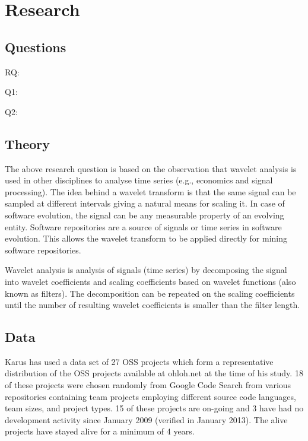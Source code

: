 \section{Research}

\subsection{Questions}

\begin{description}
	\item[RQ:] \emph{\researchQuestion}
	\item[Q1:] \emph{\subQuestionOne}
	\item[Q2:] \emph{\subQuestionTwo}
\end{description}

\subsection{Theory}
The above research question is based on the observation that wavelet analysis is
used in other disciplines to analyse time series (e.g., economics and signal
processing). The idea behind a wavelet transform is that the same signal can
be sampled at different intervals giving a natural means for scaling it. In
case of software evolution, the signal can be any measurable property of an
evolving entity. Software repositories are a source of signals or time series
in software evolution. This allows the wavelet transform to be applied directly
for mining software repositories.

Wavelet analysis is analysis of signals (time series) by decomposing the signal
into wavelet coefficients and scaling coefficients based on wavelet functions
(also known as filters). The decomposition can be repeated on the scaling
coefficients until the number of resulting wavelet coefficients is smaller than
the filter length.

\subsection{Data}
Karus has used a data set of 27 OSS projects which form a representative
distribution of the OSS projects available at ohloh.net at the time of his
study. 18 of these projects were chosen randomly from Google Code Search from
various repositories containing team projects employing different source code
languages, team sizes, and project types. 15 of these projects are on-going and
3 have had no development activity since January 2009 (verified in January
2013). The alive projects have stayed alive for a minimum of 4 years.

